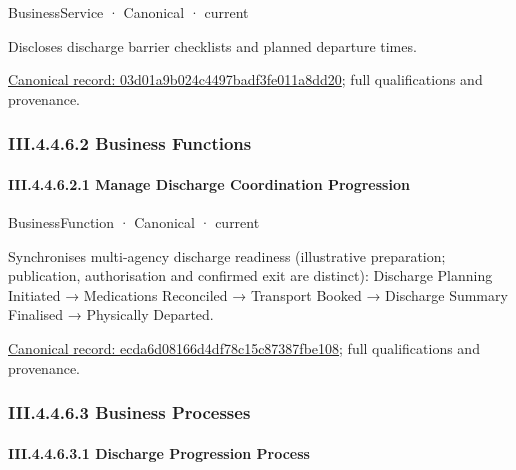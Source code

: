 \label{element:03d01a9b024c4497badf3fe011a8dd20}
{\small BusinessService · Canonical · current}\par

Discloses discharge barrier checklists and planned departure times.


{\footnotesize \href{../../../../continuum/business/business-service/03d01a9b024c4497badf3fe011a8dd20.md}{Canonical record: 03d01a9b024c4497badf3fe011a8dd20}; full qualifications and provenance.}\par
\subsubsection*{III.4.4.6.2 Business Functions}
\label{navigation:III.4.4.6.2}

\paragraph*{III.4.4.6.2.1 Manage Discharge Coordination Progression}
\label{navigation:III.4.4.6.2.1}

\label{element:ecda6d08166d4df78c15c87387fbe108}
{\small BusinessFunction · Canonical · current}\par

Synchronises multi-agency discharge readiness (illustrative preparation; publication, authorisation and confirmed exit are distinct): Discharge Planning Initiated → Medications Reconciled → Transport Booked → Discharge Summary Finalised → Physically Departed.


{\footnotesize \href{../../../../continuum/business/business-function/ecda6d08166d4df78c15c87387fbe108.md}{Canonical record: ecda6d08166d4df78c15c87387fbe108}; full qualifications and provenance.}\par
\subsubsection*{III.4.4.6.3 Business Processes}
\label{navigation:III.4.4.6.3}

\paragraph*{III.4.4.6.3.1 Discharge Progression Process}
\label{navigation:III.4.4.6.3.1}

